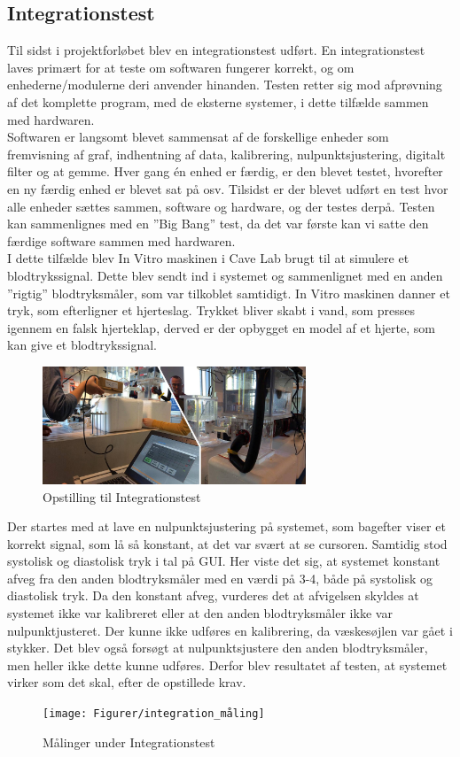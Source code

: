 \subsection{Integrationstest}
Til sidst i projektforløbet blev en integrationstest\cite{Integration} udført. En integrationstest laves primært for at teste om softwaren fungerer korrekt, og om enhederne/modulerne deri anvender hinanden. Testen retter sig mod afprøvning af det komplette program, med de eksterne systemer, i dette tilfælde sammen med hardwaren.\\
Softwaren er langsomt blevet sammensat af de forskellige enheder som fremvisning af graf, indhentning af data, kalibrering, nulpunktsjustering, digitalt filter og at gemme. Hver gang én enhed er færdig, er den blevet testet, hvorefter en ny færdig enhed er blevet sat på osv. Tilsidst er der blevet udført  en test hvor alle enheder sættes sammen, software og hardware,  og der testes derpå. Testen kan sammenlignes med en ”Big Bang” test, da det var første kan vi satte den færdige software sammen med hardwaren.\\  
I dette tilfælde blev In Vitro maskinen i Cave Lab brugt til at simulere et blodtrykssignal. Dette blev sendt ind i systemet og sammenlignet med en anden ”rigtig” blodtryksmåler, som var tilkoblet samtidigt. In Vitro maskinen danner et tryk, som efterligner et hjerteslag. Trykket bliver skabt i vand, som presses igennem en falsk hjerteklap, derved er der opbygget en model af et hjerte, som kan give et blodtrykssignal. 

\begin{figure}[H]
	\centering
	\includegraphics[width=0.7\textwidth]{Figurer/integration_opstilling}
	\caption{Opstilling til Integrationstest}
	\label{fig:Integration_opstilling}
\end{figure}

Der startes med at lave en nulpunktsjustering på systemet, som bagefter viser et korrekt signal, som lå så konstant, at det var svært at se cursoren. Samtidig stod systolisk og diastolisk tryk i tal på GUI. Her viste det sig, at systemet konstant afveg fra den anden blodtryksmåler med en værdi på 3-4, både på systolisk og diastolisk tryk. Da den konstant afveg, vurderes det at afvigelsen skyldes at systemet ikke var kalibreret eller at den anden blodtryksmåler ikke var nulpunktjusteret. Der kunne ikke udføres en kalibrering, da væskesøjlen var gået i stykker. Det blev også forsøgt at nulpunktsjustere den anden blodtryksmåler, men heller ikke dette kunne udføres. Derfor blev resultatet af testen, at systemet virker som det skal, efter de opstillede krav.  

\begin{figure}[H]
	\centering
	\texttt{[image: Figurer/integration\_måling]}
	\caption{Målinger under Integrationstest}
	\label{fig:Integration_resultat}
\end{figure}

